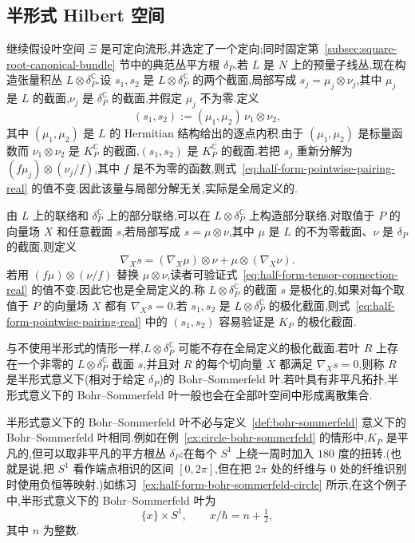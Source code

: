 \chaptertwentythreehalf

\subsection{半形式 Hilbert 空间}
\label{subsec:half-form-hilbert-space-real}

继续假设叶空间 $\Xi$ 是可定向流形,并选定了一个定向;同时固定第~\ref{subsec:square-root-canonical-bundle} 节中的典范丛平方根 $\delta_P$.若 $L$ 是 $N$ 上的预量子线丛,现在构造张量积丛 $L\otimes\delta_P^{\mathbb C}$.设 $s_1,s_2$ 是 $L\otimes\delta_P^{\mathbb C}$ 的两个截面,局部写成 $s_j=\mu_j\otimes\nu_j$,其中 $\mu_j$ 是 $L$ 的截面,$\nu_j$ 是 $\delta_P^{\mathbb C}$ 的截面,并假定 $\mu_j$ 不为零.定义
\[
 (s_1,s_2):=(\mu_1,\mu_2)\,\nu_1\otimes\nu_2,
 \label{eq:half-form-pointwise-pairing-real}
\]
其中 $(\mu_1,\mu_2)$ 是 $L$ 的 Hermitian 结构给出的逐点内积.由于 $(\mu_1,\mu_2)$ 是标量函数而 $\nu_1\otimes\nu_2$ 是 $K_P^{\mathbb C}$ 的截面,$(s_1,s_2)$ 是 $K_P^{\mathbb C}$ 的截面.若把 $s_j$ 重新分解为 $(f\mu_j)\otimes(\nu_j/f)$,其中 $f$ 是不为零的函数,则式~\eqref{eq:half-form-pointwise-pairing-real} 的值不变.因此该量与局部分解无关,实际是全局定义的.

由 $L$ 上的联络和 $\delta_P^{\mathbb C}$ 上的部分联络,可以在 $L\otimes\delta_P^{\mathbb C}$ 上构造部分联络.对取值于 $P$ 的向量场 $X$ 和任意截面 $s$,若局部写成 $s=\mu\otimes\nu$,其中 $\mu$ 是 $L$ 的不为零截面、$\nu$ 是 $\delta_P$ 的截面,则定义
\[
 \nabla_Xs=(\nabla_X\mu)\otimes\nu+\mu\otimes(\nabla_X\nu).
 \label{eq:half-form-tensor-connection-real}
\]
若用 $(f\mu)\otimes(\nu/f)$ 替换 $\mu\otimes\nu$,读者可验证式~\eqref{eq:half-form-tensor-connection-real} 的值不变.因此它也是全局定义的.称 $L\otimes\delta_P^{\mathbb C}$ 的截面 $s$ 是极化的,如果对每个取值于 $P$ 的向量场 $X$ 都有 $\nabla_Xs=0$.若 $s_1,s_2$ 是 $L\otimes\delta_P^{\mathbb C}$ 的极化截面,则式~\eqref{eq:half-form-pointwise-pairing-real} 中的 $(s_1,s_2)$ 容易验证是 $K_P$ 的极化截面.

与不使用半形式的情形一样,$L\otimes\delta_P^{\mathbb C}$ 可能不存在全局定义的极化截面.若叶 $R$ 上存在一个非零的 $L\otimes\delta_P^{\mathbb C}$ 截面 $s$,并且对 $R$ 的每个切向量 $X$ 都满足 $\nabla_Xs=0$,则称 $R$ 是半形式意义下(相对于给定 $\delta_P$)的 Bohr--Sommerfeld 叶.若叶具有非平凡拓扑,半形式意义下的 Bohr--Sommerfeld 叶一般也会在全部叶空间中形成离散集合.

半形式意义下的 Bohr--Sommerfeld 叶不必与定义~\ref{def:bohr-sommerfeld} 意义下的 Bohr--Sommerfeld 叶相同.例如在例~\ref{ex:circle-bohr-sommerfeld} 的情形中,$K_P$ 是平凡的,但可以取非平凡的平方根丛 $\delta_P$:在每个 $S^1$ 上绕一周时加入 $180$ 度的扭转.(也就是说,把 $S^1$ 看作端点相识的区间 $[0,2\pi]$,但在把 $2\pi$ 处的纤维与 0 处的纤维识别时使用负恒等映射.)如练习~\ref{ex:half-form-bohr-sommerfeld-circle} 所示,在这个例子中,半形式意义下的 Bohr--Sommerfeld 叶为
\[
 \{x\}\times S^1,\qquad x/\hbar=n+\tfrac12,
\]
其中 $n$ 为整数.

